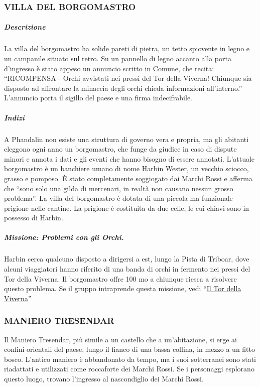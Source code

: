 \documentclass{article}
\begin{document}
\subsubsection{VILLA DEL BORGOMASTRO}
\hypertarget{villa}{}
\subparagraph{Descrizione}La villa del borgomastro ha solide pareti di pietra, un tetto
spiovente in legno e un campanile situato sul retro. Su un
pannello di legno accanto alla porta d’ingresso è stato appeso
un annuncio scritto in Comune, che recita:
“RICOMPENSA—Orchi avvistati nei pressi del Tor della
Viverna! Chiunque sia disposto ad affrontare la minaccia degli
orchi chieda informazioni all’interno.” L'annuncio porta il
sigillo del paese e una firma indecifrabile.
\subparagraph{Indizi}A Phandalin non esiste una struttura di governo vera e
propria, ma gli abitanti eleggono ogni anno un borgomastro,
che funge da giudice in caso di dispute minori e annota i dati
e gli eventi che hanno bisogno di essere annotati. L'attuale
borgomastro è un banchiere umano di nome Harbin Wester,
un vecchio sciocco, grasso e pomposo. È stato completamente
soggiogato dai Marchi Rossi e afferma che “sono solo
una gilda di mercenari, in realtà non causano nessun
grosso problema”.
La villa del borgomastro è dotata di una piccola ma
funzionale prigione nelle cantine. La prigione è costituita da
due celle, le cui chiavi sono in possesso di Harbin.
\subparagraph{Missione: Problemi con gli Orchi.}
Harbin cerca qualcuno
disposto a dirigersi a est, lungo la Pista di Triboar, dove
alcuni viaggiatori hanno riferito di una banda di orchi in
fermento nei pressi del Tor della Viverna. Il borgomastro
offre 100 mo a chiunque riesca a risolvere questo problema.
Se il gruppo intraprende questa missione, vedi “\hyperlink{tor}{Il Tor della
Viverna}”
\subsubsection{MANIERO TRESENDAR}Il Maniero Tresendar, più simile a un castello che a
un'abitazione, si erge ai confini orientali del paese, lungo il
fianco di una bassa collina, in mezzo a un fitto bosco. L'antico
maniero è abbandonato da tempo, ma i suoi sotterranei sono
stati riadattati e utilizzati come roccaforte dei Marchi Rossi.
Se i personaggi esplorano questo luogo, trovano l’ingresso al
nascondiglio dei Marchi Rossi.
\end{document}
